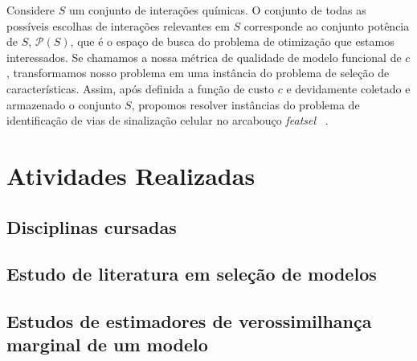 \documentclass[12pt]{article}
\newcommand{\powerset}{\mathcal{P}}
\begin{document}
Considere $S$ um conjunto de interações químicas. O conjunto de todas
as possíveis escolhas de interações relevantes em $S$ corresponde ao
conjunto potência de $S$, $\powerset(S)$, que é o espaço de busca do
problema de otimização que estamos interessados. Se chamamos a nossa 
métrica de qualidade de modelo funcional de $c$, transformamos nosso 
problema em uma instância do problema de seleção de características. 
Assim, após definida a função de custo $c$ e devidamente coletado e 
armazenado o conjunto $S$, propomos resolver instâncias do problema de 
identificação de vias de sinalização celular no arcabouço 
{\em featsel} ~\cite{Reis2017featsel}. 

\section{Atividades Realizadas}

\subsection{Disciplinas cursadas}

\subsection{Estudo de literatura em seleção de modelos}



\subsection{Estudos de estimadores de verossimilhança marginal de um 
modelo}
\end{document}
